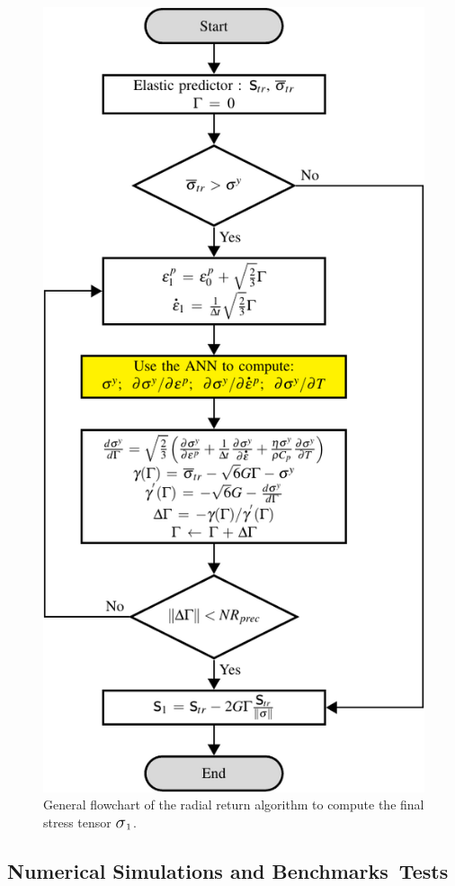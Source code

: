 \documentclass[algorithms,article,accept,pdftex,oneauthors]{Definitions/mdpi}
\DeclareRobustCommand{\Sig}{\mbox{\Large\ensuremath{\sigma}}}
\begin{document}
\begin{figure}[H]
\includegraphics[width=0.6\columnwidth]{Figures/VumatGeneralNewtonRaphson}
\caption{General flowchart of the radial return algorithm to compute the final stress tensor $\Sig_1$.}
\label{fig:RadialReturn}
\end{figure}
\unskip

\subsection{Numerical Simulations and Benchmarks~Tests}\label{sec:Simulations}
\end{document}
